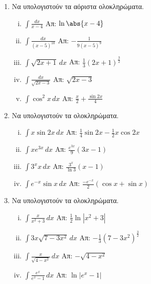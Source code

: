 \documentclass[a4paper,table]{report}
\begin{document}
\begin{center}
  \minibox{{\bfseries \large \textcolor{Col1}{Ασκήσεις στα Ολοκληρώματα}}}
\end{center}

\vspace{\baselineskip}


\begin{enumerate}
  \item Να υπολογιστούν τα αόριστα ολοκληρώματα.
    \begin{enumerate}[i)]
      \item $ \int \frac{dx}{x-4}$ \hfill Απ: $ \ln{\abs{x-4}} $ 
      \item $\int\frac{dx}{(x-5)^{10}} $ \hfill Απ: $-\frac{1}{9(x-5)^9}$
      \item $ \int \sqrt{ 2x+1 } \,{dx} $ \hfill Απ: 
        $ \frac{ 1 }{ 3 } (2x+1)^{\frac{ 3 }{ 2 } } $
      \item $ \int\frac{dx}{\sqrt{2x-3}}$ \hfill Απ: $ \sqrt{2x-3} $
      \item $\int\cos^2x \, dx$ \hfill Απ: $\frac{x}{2} + \frac{\sin2x}{4}$
    \end{enumerate}

  \item Να υπολογιστούν τα ολοκληρώματα.
    \begin{enumerate}[i)]
      \item $\int x\sin2x \, dx$ \hfill Απ: $\frac{1}{4}\sin2x-\frac{1}{2}x\cos2x$
      \item $\int xe^{3x} \, dx$ \hfill Απ: $\frac{e^{3x}}{9}(3x-1)$
      \item $\int 3^{x}x \, dx$ \hfill Απ: $\frac{3^x}{\ln 3}(x-1)$
      \item $\int e^{-x}\sin x \, dx$ 
        \hfill Απ: $\frac{-e^{-x}}{2}(\cos x+\sin x)$
    \end{enumerate}

  \item Να υπολογιστούν τα ολοκληρώματα.
    \begin{enumerate}[i)]
      \item $\int\frac{x}{x^2+3} \, dx$ \hfill Απ: $\frac{1}{2}\ln|x^2+3|$
      \item $ \int 3x \sqrt{ 7-3x^{2} } \,{dx} $ 
        \hfill Απ: $ - \frac{1}{ 3 } (7-3x^{2})^{\frac{ 3 }{ 2 }} $
      \item $ \int \frac{x}{\sqrt{4-x^{2}}} \,{dx} $ \hfill Απ: $ - \sqrt{4-x^{2}} $ 
      \item $\int \frac{e^x}{e^x-1} \, dx$ \hfill Απ: $\ln|e^x-1|$
    \end{enumerate}


\end{enumerate}
\end{document}
